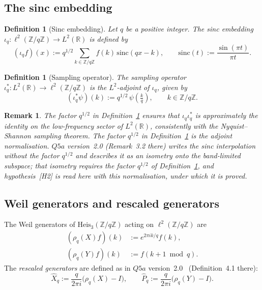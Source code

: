 \documentclass[12pt,a4paper]{article}
\newtheorem{definition}[theorem]{Definition}
\newtheorem{remark}[theorem]{Remark}
\newcommand{\Heis}{\mathrm{Heis}_3}
\newcommand{\Zq}{\mathbb{Z}/q\mathbb{Z}}
\newcommand{\ltwo}{L^2(\mathbb{R})}
\newcommand{\ltwod}{\ell^2(\Zq)}
\newcommand{\iotaq}{\iota_q}
\newcommand{\iotastar}{\iota_q^*}
\newcommand{\Xhat}{\hat{X}_q}
\newcommand{\Phat}{\hat{P}_q}
\begin{document}
    \subsection{The sinc embedding}

      \begin{definition}[Sinc embedding]
        \label{def:sinc}
        Let $q$ be a positive integer.
        The \emph{sinc embedding} $\iotaq : \ltwod \to \ltwo$ is defined by
        \[
          (\iotaq f)(x) := q^{1/2} \sum_{k \in \Zq} f(k)\,\mathrm{sinc}\!\left(qx - k\right),
          \qquad \mathrm{sinc}(t) := \frac{\sin(\pi t)}{\pi t}.
        \]
      \end{definition}

      \begin{definition}[Sampling operator]
        \label{def:sampling}
        The \emph{sampling operator} $\iotastar : \ltwo \to \ltwod$ is the $L^2$-adjoint of $\iotaq$,
        given by
        \[
          (\iotastar \psi)(k) := q^{1/2}\,\psi\!\left(\tfrac{k}{q}\right), \qquad k \in \Zq.
        \]
      \end{definition}

      \begin{remark}
        \label{rem:normalisation}
        The factor $q^{1/2}$ in Definition~\ref{def:sinc} ensures that
        $\iotaq \iotastar$ is approximately the identity on the low-frequency sector of $\ltwo$,
        consistently with the Nyquist--Shannon sampling theorem.
        The factor $q^{1/2}$ in Definition~\ref{def:sampling} is the adjoint normalisation.
        $Q5a$ version~2.0 (Remark~3.2 there) writes the sinc interpolation without the factor
        $q^{1/2}$ and describes it as an isometry onto the band-limited subspace; that isometry
        requires the factor $q^{1/2}$ of Definition~\ref{def:sinc}, and hypothesis~[H2] is read
        here with this normalisation, under which it is proved.
      \end{remark}

    \subsection{Weil generators and rescaled generators}

      The Weil generators of $\Heis(\Zq)$ acting on $\ltwod$ are
      \begin{align*}
        (\rho_q(X)f)(k) &:= e^{2\pi ik/q} f(k), \\
        (\rho_q(Y)f)(k) &:= f(k+1 \bmod q).
      \end{align*}
      The \emph{rescaled generators} are defined as in $Q5a$ version~2.0~\cite{Beau2026q5a}
      (Definition~4.1 there):
      \[
        \Xhat := \frac{q}{2\pi i}\bigl(\rho_q(X) - I\bigr), \qquad
        \Phat := \frac{q}{2\pi i}\bigl(\rho_q(Y) - I\bigr).
      \]
\end{document}
